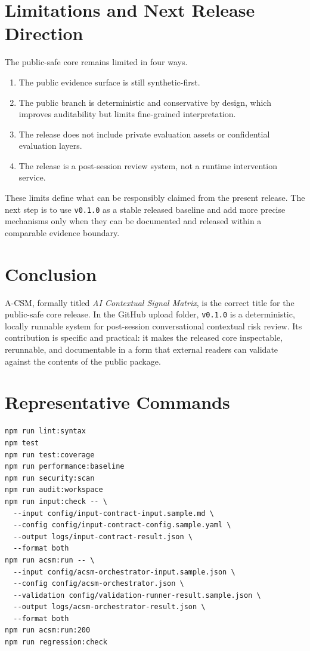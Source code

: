 \documentclass[11pt,a4paper]{article}
\begin{document}
\section{Limitations and Next Release Direction}

The public-safe core remains limited in four ways.

\begin{enumerate}[leftmargin=1.8em]
\item The public evidence surface is still synthetic-first.
\item The public branch is deterministic and conservative by design, which improves auditability but limits fine-grained interpretation.
\item The release does not include private evaluation assets or confidential evaluation layers.
\item The release is a post-session review system, not a runtime intervention service.
\end{enumerate}

These limits define what can be responsibly claimed from the present release. The next step is to use \texttt{v0.1.0} as a stable released baseline and add more precise mechanisms only when they can be documented and released within a comparable evidence boundary.

\section{Conclusion}

A-CSM, formally titled \textit{AI Contextual Signal Matrix}, is the correct title for the public-safe core release. In the GitHub upload folder, \texttt{v0.1.0} is a deterministic, locally runnable system for post-session conversational contextual risk review. Its contribution is specific and practical: it makes the released core inspectable, rerunnable, and documentable in a form that external readers can validate against the contents of the public package.

\appendix

\section{Representative Commands}

\begin{verbatim}
npm run lint:syntax
npm test
npm run test:coverage
npm run performance:baseline
npm run security:scan
npm run audit:workspace
npm run input:check -- \
  --input config/input-contract-input.sample.md \
  --config config/input-contract-config.sample.yaml \
  --output logs/input-contract-result.json \
  --format both
npm run acsm:run -- \
  --input config/acsm-orchestrator-input.sample.json \
  --config config/acsm-orchestrator.json \
  --validation config/validation-runner-result.sample.json \
  --output logs/acsm-orchestrator-result.json \
  --format both
npm run acsm:run:200
npm run regression:check
\end{verbatim}
\end{document}
